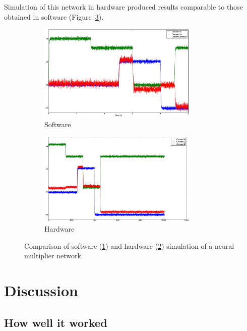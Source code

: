 \documentclass[english]{article}
\begin{document}
Simulation of this network in hardware produced results comparable to those obtained in software
(Figure~\ref{fig:multiplier}).

\begin{figure}
\centering


\begin{subfigure}[b]{0.5\textwidth}
\centering
\includegraphics[width=3in]{multiplier-sw.eps}
\caption{Software}
\label{fig:multiplier:sw}
\end{subfigure}

\begin{subfigure}[b]{0.5\textwidth}
\centering
\includegraphics[width=3in]{multiplier.eps}
\caption{Hardware}
\label{fig:multiplier:hw}
\end{subfigure}

\caption[Multiplier simulation comparison.]
{Comparison of software (\ref{fig:multiplier:sw}) and hardware (\ref{fig:multiplier:hw})
simulation of a neural multiplier network.}
\label{fig:multiplier}
\end{figure}

\section{Discussion}

\subsection{How well it worked}
\end{document}
